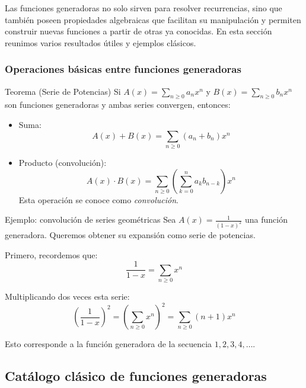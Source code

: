 Las funciones generadoras no solo sirven para resolver recurrencias, sino que también poseen propiedades algebraicas que facilitan su manipulación y permiten construir nuevas funciones a partir de otras ya conocidas. En esta sección reunimos varios resultados útiles y ejemplos clásicos.

\subsubsection{Operaciones básicas entre funciones generadoras}

\begin{thmblock}{Teorema (Serie de Potencias)}
Si $A(x) = \sum_{n\geq 0} a_n x^n$ y $B(x) = \sum_{n\geq 0} b_n x^n$ son funciones generadoras y ambas series convergen, entonces:

\begin{itemize}
  \item Suma:
  \[
  A(x) + B(x) = \sum_{n\geq 0} (a_n + b_n) x^n
  \]

  \item Producto (convolución):
  \[
  A(x) \cdot B(x) = \sum_{n\geq 0} \left(\sum_{k=0}^{n} a_k b_{n-k} \right) x^n
  \]
  Esta operación se conoce como \emph{convolución}.
\end{itemize}
\end{thmblock}

\begin{exampleblock}{Ejemplo: convolución de series geométricas}
Sea $A(x)=\frac{1}{(1 - x)^2}$ una función generadora.
Queremos obtener su expansión como serie de potencias.

Primero, recordemos que:
\[
\frac{1}{1 - x} = \sum_{n\geq 0} x^n
\]

Multiplicando dos veces esta serie:
\[
\left(\frac{1}{1 - x}\right)^2 = \left(\sum_{n\geq 0} x^n\right)^2 = \sum_{n\geq 0} (n + 1) x^n
\]

Esto corresponde a la función generadora de la secuencia $1, 2, 3, 4, \dots$.
\end{exampleblock}

\subsection{Catálogo clásico de funciones generadoras}

